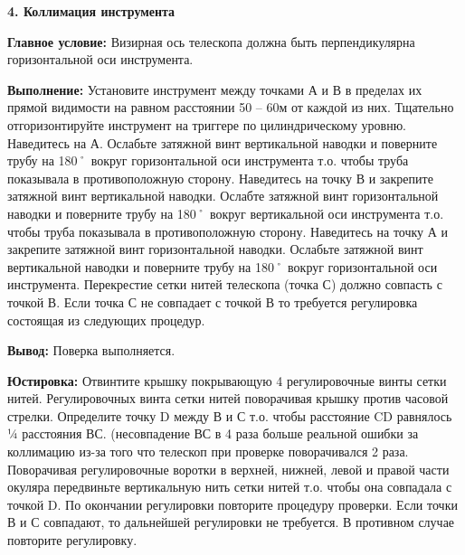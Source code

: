 \documentclass[a4paper]{article}
\begin{document}
\begin{newpage}
{        \par\textbf{4. Коллимация инструмента}
        \par\textbf{Главное условие:} Визирная ось телескопа должна быть перпендикулярна горизонтальной оси инструмента.
        \par\textbf{Выполнение:} Установите инструмент между точками А и В в пределах их прямой видимости на равном расстоянии 50 – 60м от каждой из них. Тщательно отгоризонтируйте инструмент на триггере по цилиндрическому уровню. Наведитесь на А. Ослабьте затяжной винт вертикальной наводки и поверните трубу на 180˚ вокруг горизонтальной оси инструмента т.о. чтобы труба показывала в противоположную сторону. Наведитесь на точку В и закрепите затяжной винт вертикальной наводки. Ослабте затяжной винт горизонтальной наводки и поверните трубу на 180˚ вокруг вертикальной оси инструмента т.о. чтобы труба показывала в противоположную сторону. Наведитесь на точку А и закрепите затяжной винт горизонтальной наводки. Ослабьте затяжной винт вертикальной наводки и поверните трубу на 180˚ вокруг горизонтальной оси инструмента. Перекрестие сетки нитей телескопа (точка С) должно совпасть с точкой В. Если точка С не совпадает с точкой В то требуется регулировка состоящая из следующих процедур.
        \par\textbf{Вывод:} Поверка выполняется.
        \par\textbf{Юстировка:} Отвинтите крышку покрывающую 4 регулировочные винты сетки нитей. Регулировочных винта сетки нитей поворачивая крышку против часовой стрелки. Определите точку D между В и С т.о. чтобы расстояние CD равнялось ¼ расстояния ВС. (несовпадение ВС в 4 раза больше реальной ошибки за коллимацию из-за того что телескоп при проверке поворачивался 2 раза. Поворачивая регулировочные воротки в верхней, нижней, левой и правой части окуляра передвиньте вертикальную нить сетки нитей т.о. чтобы она совпадала с точкой D. По окончании регулировки повторите процедуру проверки. Если точки В и С совпадают, то дальнейшей регулировки не требуется. В противном случае повторите регулировку.\\
    
}
\end{newpage}
\end{document}
